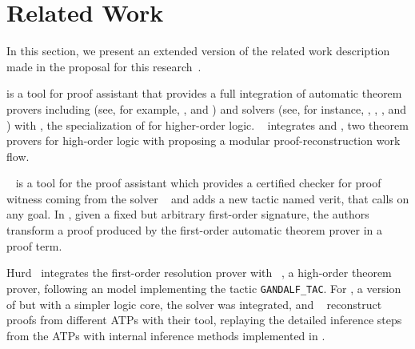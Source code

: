 \documentclass[../main.tex]{subfiles}
\begin{document}

\section{Related Work}
\label{sec:related-work}

In this section, we present an extended version of the related work description made in the proposal for this research~\cite{Sicard-Ramirez2016}.

 is a tool for  proof assistant
\cite{paulson1994isabelle} that provides a full integration of
automatic theorem provers including \ATPs (see, for example,
\cite{meng2006automation}, \cite{blanchette2013extending} and
\cite{Fleury2014}) and \SMT solvers (see, for instance,
\cite{hurlin07practical}, \cite{bohme2010},
\cite{blanchette2013extending}, and \cite{Fleury2014}) with
 \cite{nipkow2002isabelle}, the specialization of
 for higher-order logic.
\citeauthor{Een2004}~\cite{Een2004} integrates  and
, two theorem provers for high-order logic with
 proposing a modular proof-reconstruction work
flow.

~\cite{armand2011,Ekici2017} is a tool for the
 proof assistant \cite{coqteam} which provides a certified
checker for proof witness coming from the \SMT solver
~\cite{bouton2009} and adds a new tactic named verit,
that calls  on any  goal.
In \cite{Bezem2002},
given a fixed but arbitrary first-order signature, the authors
transform a proof produced by the first-order automatic theorem
prover  \cite{deNivelle2003} in a  proof
term.

Hurd~\cite{Hurd1999} integrates the first-order resolution prover
 with ~\cite{norrish2007hol}, a high-order
theorem prover, following an  model implementing the
tactic \verb!GANDALF_TAC!. For , a version of
 but with a simpler logic core, the \SMT solver 
was integrated, and \citeauthor{kaliszyk2013}~\cite{kaliszyk2013}
reconstruct proofs from different ATPs with their  tool,
replaying the detailed inference steps from the ATPs with internal
inference methods implemented in .

\end{document}
